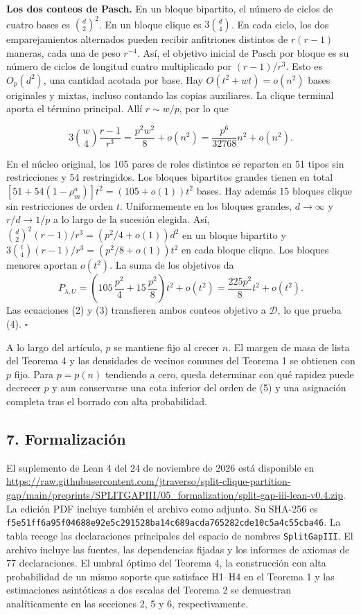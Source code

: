\documentclass[spanish,11pt,a4paper]{article}
\begin{document}
\textbf{Los dos conteos de Pasch.} En un bloque bipartito, el número de ciclos de cuatro bases es \(\binom d2^2\). En un bloque clique es \(3\binom d4\). En cada ciclo, los dos emparejamientos alternados pueden recibir anfitriones distintos de \(r(r-1)\) maneras, cada una de peso \(r^{-4}\). Así, el objetivo inicial de Pasch por bloque es su número de ciclos de longitud cuatro multiplicado por \((r-1)/r^3\). Esto es \(O_p(d^2)\), una cantidad acotada por base. Hay \(O(t^2+wt)=o(n^2)\) bases originales y mixtas, incluso contando las copias auxiliares. La clique terminal aporta el término principal. Allí \(r\sim w/p\), por lo que

\[3\binom w4\frac{r-1}{r^3}
   =\frac{p^2w^2}{8}+o(n^2)
   =\frac{p^6}{32768}n^2+o(n^2).\]

En el núcleo original, los 105 pares de roles distintos se reparten en 51 tipos sin restricciones y 54 restringidos. Los bloques bipartitos grandes tienen en total \([51+54(1-\rho_m^a)]t^2=(105+o(1))t^2\) bases. Hay además 15 bloques clique sin restricciones de orden \(t\). Uniformemente en los bloques grandes, \(d\to\infty\) y \(r/d\to1/p\) a lo largo de la sucesión elegida. Así, \(\binom d2^2(r-1)/r^3=(p^2/4+o(1))d^2\) en un bloque bipartito y \(3\binom t4(r-1)/r^3=(p^2/8+o(1))t^2\) en cada bloque clique. Los bloques menores aportan \(o(t^2)\). La suma de los objetivos da \[P_{\lambda,U}=\left(105\,\frac{p^2}{4}+15\,\frac{p^2}{8}\right)t^2+o(t^2)
=\frac{225p^2}{8}t^2+o(t^2).\] Las ecuaciones (2) y (3) transfieren ambos conteos objetivo a \(\mathcal D\), lo que prueba (4). \(\square\)

A lo largo del artículo, \(p\) se mantiene fijo al crecer \(n\). El margen de masa de lista del Teorema 4 y las densidades de vecinos comunes del Teorema 1 se obtienen con \(p\) fijo. Para \(p=p(n)\) tendiendo a cero, queda determinar con qué rapidez puede decrecer \(p\) y aun conservarse una cota inferior del orden de (5) y una asignación completa tras el borrado con alta probabilidad.

\subsection{7. Formalización}\label{formalizaciuxf3n}

El suplemento de Lean 4 del 24 de noviembre de 2026 está disponible en \url{https://raw.githubusercontent.com/jtraverso/split-clique-partition-gap/main/preprints/SPLITGAPIII/05_formalization/split-gap-iii-lean-v0.4.zip}. La edición PDF incluye también el archivo como adjunto. Su SHA-256 es \nolinkurl{f5e51ff6a95f04688e92e5c291528ba14c689acda765282cde10c5a4c55cba46}. La tabla recoge las declaraciones principales del espacio de nombres \texttt{SplitGapIII}. El archivo incluye las fuentes, las dependencias fijadas y los informes de axiomas de 77 declaraciones. El umbral óptimo del Teorema 4, la construcción con alta probabilidad de un mismo soporte que satisface H1--H4 en el Teorema 1 y las estimaciones asintóticas a dos escalas del Teorema 2 se demuestran analíticamente en las secciones 2, 5 y 6, respectivamente.
\end{document}
